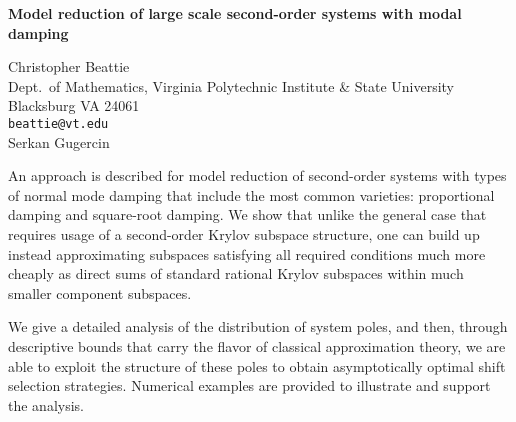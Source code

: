 \documentclass{report}
\begin{document}

\begin{center}
{\large
{\bf Model reduction of large scale second-order systems with modal damping}}

	Christopher Beattie \\
	Dept.~of Mathematics,
	Virginia Polytechnic Institute \& State University \\
	Blacksburg VA 24061 \\
	{\tt beattie@vt.edu} \\
	Serkan Gugercin
\end{center}
An approach is described for model reduction of second-order
systems with types of normal mode damping that include the
most common varieties: proportional damping and square-root
damping. We show that unlike the general case that requires
usage of a second-order Krylov subspace structure, one can
build up instead approximating subspaces satisfying all
required conditions much more cheaply as direct sums of
standard rational Krylov subspaces within much smaller
component subspaces.

We give a detailed analysis of the
distribution of system poles, and then, through descriptive
bounds that carry the flavor of classical approximation
theory, we are able to exploit the structure of these poles
to obtain asymptotically optimal shift selection strategies.
Numerical examples are provided to illustrate and support
the analysis.


\end{document}
